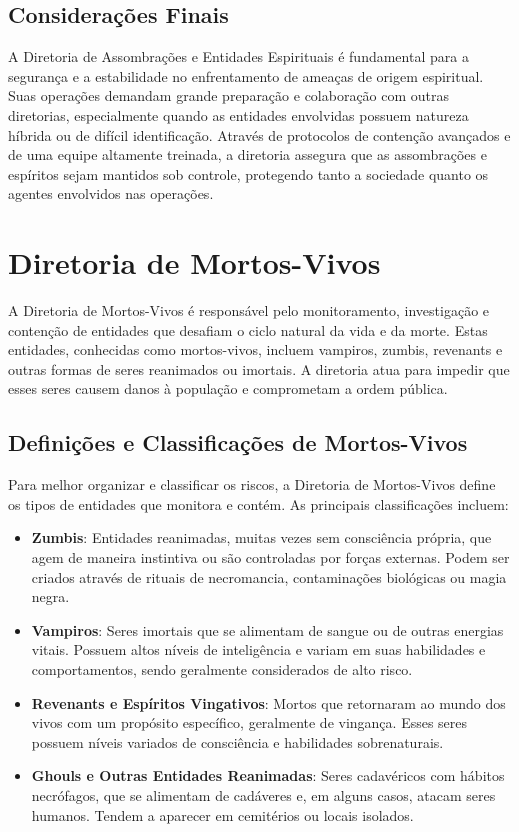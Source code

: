\section{Considerações Finais}

A Diretoria de Assombrações e Entidades Espirituais é fundamental para a segurança e a estabilidade no enfrentamento de ameaças de origem espiritual. Suas operações demandam grande preparação e colaboração com outras diretorias, especialmente quando as entidades envolvidas possuem natureza híbrida ou de difícil identificação. Através de protocolos de contenção avançados e de uma equipe altamente treinada, a diretoria assegura que as assombrações e espíritos sejam mantidos sob controle, protegendo tanto a sociedade quanto os agentes envolvidos nas operações.

\chapter{Diretoria de Mortos-Vivos}

A Diretoria de Mortos-Vivos é responsável pelo monitoramento, investigação e contenção de entidades que desafiam o ciclo natural da vida e da morte. Estas entidades, conhecidas como mortos-vivos, incluem vampiros, zumbis, revenants e outras formas de seres reanimados ou imortais. A diretoria atua para impedir que esses seres causem danos à população e comprometam a ordem pública.

\section{Definições e Classificações de Mortos-Vivos}
Para melhor organizar e classificar os riscos, a Diretoria de Mortos-Vivos define os tipos de entidades que monitora e contém. As principais classificações incluem:

\begin{itemize}
    \item \textbf{Zumbis}: Entidades reanimadas, muitas vezes sem consciência própria, que agem de maneira instintiva ou são controladas por forças externas. Podem ser criados através de rituais de necromancia, contaminações biológicas ou magia negra.
    \item \textbf{Vampiros}: Seres imortais que se alimentam de sangue ou de outras energias vitais. Possuem altos níveis de inteligência e variam em suas habilidades e comportamentos, sendo geralmente considerados de alto risco.
    \item \textbf{Revenants e Espíritos Vingativos}: Mortos que retornaram ao mundo dos vivos com um propósito específico, geralmente de vingança. Esses seres possuem níveis variados de consciência e habilidades sobrenaturais.
    \item \textbf{Ghouls e Outras Entidades Reanimadas}: Seres cadavéricos com hábitos necrófagos, que se alimentam de cadáveres e, em alguns casos, atacam seres humanos. Tendem a aparecer em cemitérios ou locais isolados.
\end{itemize}

